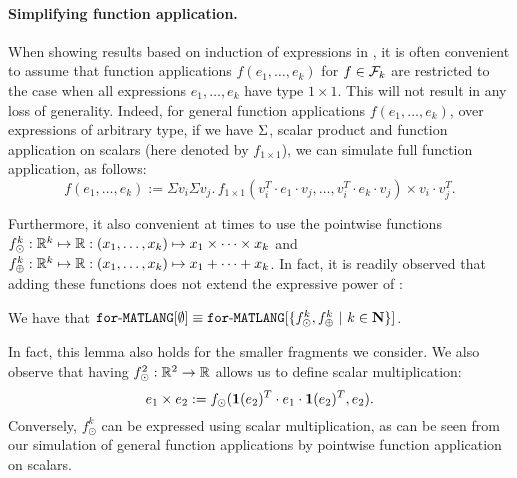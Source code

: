 \paragraph{Simplifying function application.} When showing results based on induction of expressions in \langfor, it is often convenient to assume that function applications $f(e_1,\ldots,e_k)$ for $f\in\mathcal{F}_k$ are restricted to
the case when all expressions $e_1,\ldots,e_k$ have type $1\times 1$. This will not result in any loss of generality. Indeed,
for general function applications $f(e_1,\ldots,e_k)$, over expressions of arbitrary type, if we have $\Sigma$, scalar product and function application on scalars (here denoted by $f_{1\times 1}$), we can simulate full function application, as follows:
 $$
f(e_1,\ldots, e_k) :=\Sigma v_i \Sigma v_j. \, f_{1\times 1}(v_i^T\cdot e_1\cdot v_j, \ldots ,v_i^T\cdot e_k\cdot v_j) \times v_i\cdot v_j^T.
$$

Furthermore, it also convenient at times to use the pointwise functions
$f_\odot^k:\mathbb{R}^k\mapsto \mathbb{R}:(x_1,\ldots,x_k)\mapsto x_1\times \cdots \times x_k$ and 
$f_\oplus^k:\mathbb{R}^k\mapsto \mathbb{R}:(x_1,\ldots,x_k)\mapsto x_1+\cdots + x_k$. In fact, it is readily observed that adding these functions does not extend the expressive power of \langfor:
\begin{lemma}
\label{lm-prod-sum}
We have that $\texttt{for}\text{-}\texttt{MATLANG}[\emptyset] \equiv \texttt{for}\text{-}\texttt{MATLANG}[\{f_\odot^k,f_\oplus^k \ | \ k\in \mathbf{N}\}]$.
\end{lemma}
In fact, this lemma also holds for the smaller fragments we consider.
%
We also observe that having $f_\odot^2:\mathbb{R}^2\to\mathbb{R}$ allows us to define scalar multiplication:
$$
e_1\times e_2 :=f_{\odot}(\mathbf{1}(e_2)^T\cdot e_1 \cdot \mathbf{1}(e_2)^T, e_2).
$$
Conversely, $f_\odot^k$ can be expressed using scalar multiplication, as can be seen from our simulation of general function applications by pointwise function application on scalars.

